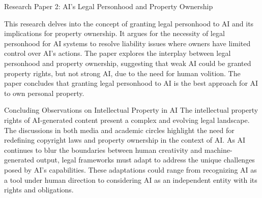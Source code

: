 \documentclass[11pt]{article}
\begin{document}
Research Paper 2: AI’s Legal Personhood and Property Ownership

This research delves into the concept of granting legal personhood to AI and its implications for property ownership. It argues for the necessity of legal personhood for AI systems to resolve liability issues where owners have limited control over AI's actions. The paper explores the interplay between legal personhood and property ownership, suggesting that weak AI could be granted property rights, but not strong AI, due to the need for human volition. The paper concludes that granting legal personhood to AI is the best approach for AI to own personal property.

Concluding Observations on Intellectual Property in AI
The intellectual property rights of AI-generated content present a complex and evolving legal landscape. The discussions in both media and academic circles highlight the need for redefining copyright laws and property ownership in the context of AI. As AI continues to blur the boundaries between human creativity and machine-generated output, legal frameworks must adapt to address the unique challenges posed by AI’s capabilities. These adaptations could range from recognizing AI as a tool under human direction to considering AI as an independent entity with its rights and obligations.



\end{document}
